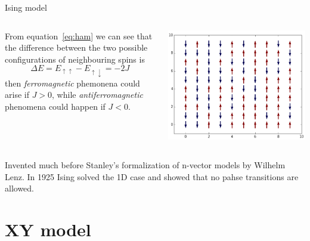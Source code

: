 \documentclass{beamer}
\begin{document}
\begin{frame}{Ising model}

\begin{columns}
From equation~\ref{eq:ham} we can see that the difference between the two possible
configurations of neighbouring spins is
\begin{equation*}
\Delta E = E_{\uparrow \uparrow} - E_{\uparrow \downarrow} = -2 J
\end{equation*}
then \emph{ferromagnetic} phemonena could arise if $J > 0$, while  
\emph{antiferromagnetic} phenomena could happen if $J < 0$.

\includegraphics[scale=0.18]{2D_ising.png}

\end{columns}

\vspace{5mm}
Invented much before Stanley's formalization of n-vector models by Wilhelm Lenz.
In 1925 Ising solved the 1D case and showed that no pahse transitions are allowed.

\end{frame}


\section{XY model}
\end{document}
